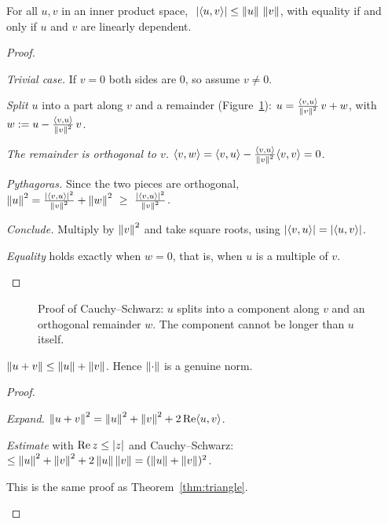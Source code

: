 \begin{theorem}\label{thm:cs}
  For all $u,v$ in an inner product space, $\ \left|\langle u,v\rangle\right|\le\left\|u\right\|\,\left\|v\right\|$, with equality if and only if $u$ and $v$ are linearly dependent.
\end{theorem}
\begin{proof}
  \begin{steps}
    \item \emph{Trivial case.} If $v=0$ both sides are $0$, so assume $v\ne0$.
    \item \emph{Split $u$} into a part along $v$ and a remainder (Figure~\ref{fig:cs}): $u=\frac{\langle v,u\rangle}{\left\|v\right\|^2}\,v+w$, with $w:=u-\frac{\langle v,u\rangle}{\left\|v\right\|^2}\,v$.
    \item \emph{The remainder is orthogonal to $v$.} $\langle v,w\rangle=\langle v,u\rangle-\frac{\langle v,u\rangle}{\left\|v\right\|^2}\langle v,v\rangle=0$.
    \item \emph{Pythagoras.} Since the two pieces are orthogonal, $\left\|u\right\|^2=\frac{\left|\langle v,u\rangle\right|^2}{\left\|v\right\|^2}+\left\|w\right\|^2\ \ge\ \frac{\left|\langle v,u\rangle\right|^2}{\left\|v\right\|^2}$.
    \item \emph{Conclude.} Multiply by $\left\|v\right\|^2$ and take square roots, using $\left|\langle v,u\rangle\right|=\left|\langle u,v\rangle\right|$.
    \item \emph{Equality} holds exactly when $w=0$, that is, when $u$ is a multiple of $v$. \qedhere
  \end{steps}
\end{proof}

\begin{figure}[htb]
  \centering
  \caption{Proof of Cauchy--Schwarz: $u$ splits into a component along $v$ and an orthogonal remainder $w$. The component cannot be longer than $u$ itself.}
  \label{fig:cs}
\end{figure}

\begin{corollary}\label{cor:tri-norm}
  $\left\|u+v\right\|\le\left\|u\right\|+\left\|v\right\|$. Hence $\left\|\cdot\right\|$ is a genuine norm.
\end{corollary}
\begin{proof}
  \begin{steps}
    \item \emph{Expand.} $\left\|u+v\right\|^2=\left\|u\right\|^2+\left\|v\right\|^2+2\operatorname{Re}\langle u,v\rangle$.
    \item \emph{Estimate} with $\operatorname{Re} z\le\left|z\right|$ and Cauchy--Schwarz: $\le\left\|u\right\|^2+\left\|v\right\|^2+2\left\|u\right\|\left\|v\right\|=(\left\|u\right\|+\left\|v\right\|)^2$.
    \item This is the same proof as Theorem~\ref{thm:triangle}. \qedhere
  \end{steps}
\end{proof}

